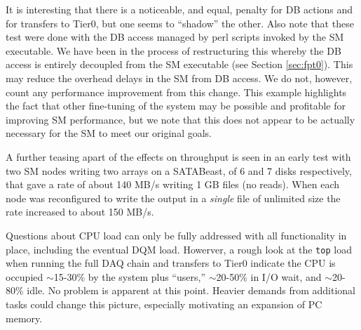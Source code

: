 It is interesting that there is a noticeable, and equal,  penalty for DB actions
and for transfers to Tier0, but one seems to ``shadow'' the other.
Also note that these test were done with the DB access managed by perl scripts invoked
by the SM executable. We have been in the process of restructuring this whereby
the DB access is entirely decoupled from the SM executable (see Section \ref{sec:fpt0}).
This may reduce the overhead delays in the SM from DB access.
We do not, however, count any performance improvement from this change.
This example highlights the fact that other fine-tuning of the system may be possible
and profitable for improving SM performance, but we note that this does not appear 
to be actually necessary for the SM to meet our original goals.

A further teasing apart of the effects on throughput is seen in an early
test with two SM nodes writing two arrays on a SATABeast, of 6 and 7 disks respectively,
that gave a rate of about 140 MB/s writing 1 GB files (no reads).
When each node was reconfigured to write the output in a {\it single} file of unlimited
size the rate increased to about  150 MB/s.

Questions about CPU load can only be fully addressed with all functionality
in place, including the eventual DQM load.
Howerver, a rough look at the \verb+top+ load when running the full DAQ chain and
transfers to Tier0 indicate the CPU is occupied $\sim$15-30\% by the system plus ``users,''
$\sim$20-50\% in I/O wait, and $\sim$20-80\% idle.
No problem is apparent at this point.
Heavier demands from additional tasks could change this picture, 
especially motivating an expansion of PC memory.

